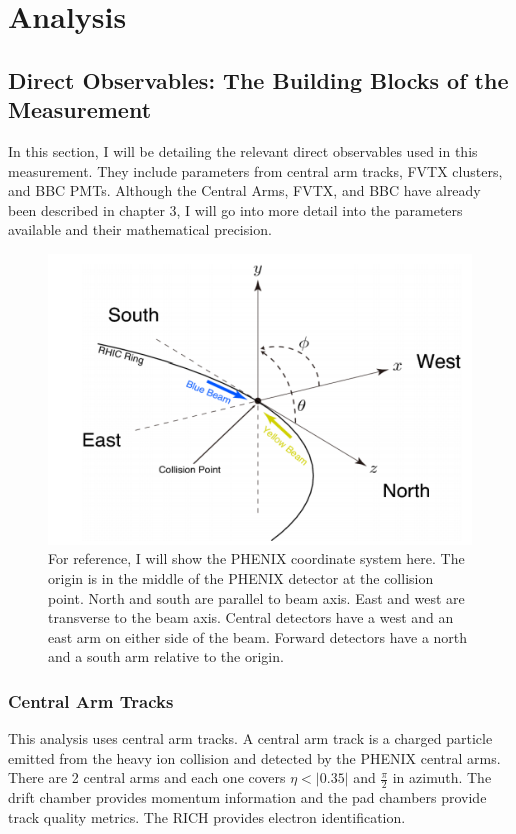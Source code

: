 \chapter{Analysis}
\section{Direct Observables: The Building Blocks of the Measurement}
In this section, I will be detailing the relevant direct observables used in this measurement. They include parameters from central arm tracks, FVTX clusters, and BBC PMTs. Although the Central Arms, FVTX, and BBC have already been described in chapter 3, I will go into more detail into the parameters available and their mathematical precision. 

\begin{figure}[!h]
\begin{center}
\includegraphics[width=0.55\linewidth]{figs/phenix_coord.png}
\caption{For reference, I will show the PHENIX coordinate system here. The origin is in the middle of the PHENIX detector at the collision point. North and south are parallel to beam axis. East and west are transverse to the beam axis. Central detectors have a west and an east arm on either side of the beam. Forward detectors have a north and a south arm relative to the origin.}
\end{center}
\end{figure}
\subsection{Central Arm Tracks}
This analysis uses central arm tracks. A central arm track is a charged particle emitted from the heavy ion collision and detected by the PHENIX central arms.
There are 2 central arms and each one covers $\eta < |0.35|$ and $\frac{\pi}{2}$ in azimuth. The drift chamber provides momentum information and the
pad chambers provide track quality metrics. The RICH provides electron identification. 

